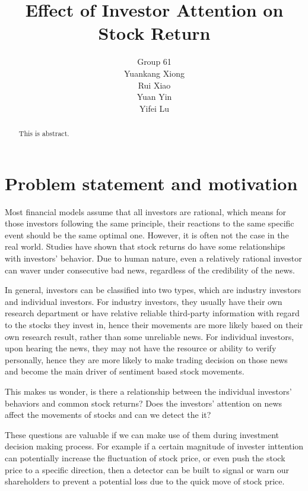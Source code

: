 \documentclass[letterpaper]{article}
\title{Effect of Investor Attention on Stock Return}
\author{%
Group 61\\
  Yuankang Xiong\\
  Rui Xiao\\
  Yuan Yin\\
  Yifei Lu
}
\begin{document}

\maketitle

\begin{abstract}
  This is abstract.
\end{abstract}

\section{Problem statement and motivation}
\label{statement}

Most financial models assume that all investors are rational, which means for those investors following the same principle, their reactions to the same specific event should be the same optimal one. However, it is often not the case in the real world. Studies have shown that stock returns do have some relationships with investors' behavior. Due to human nature, even a relatively rational investor can waver under consecutive bad news, regardless of the credibility of the news. 

In general, investors can be classified into two types, which are industry investors and individual investors. For industry investors, they usually have their own research department or have relative reliable third-party information with regard to the stocks they invest in, hence their movements are more likely based on their own research result, rather than some unreliable news. For individual investors, upon hearing the news, they may not have the resource or ability to verify personally, hence they are more likely to make trading decision on those news and become the main driver of sentiment based stock movements.

This makes us wonder, is there a relationship between the individual investors' behaviors and common stock returns? Does the investors' attention on news affect the movements of stocks and can we detect the it?

These questions are valuable if we can make use of them during investment decision making process. For example if a certain magnitude of invester inttention can potentially increase the fluctuation of stock price, or even push the stock price to a specific direction, then a detector can be built to signal or warn our shareholders to prevent a potential loss due to the quick move of stock price.
\end{document}
